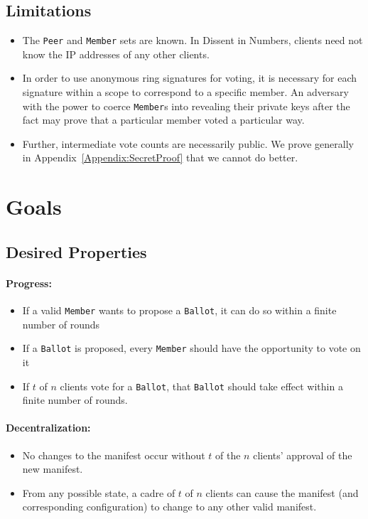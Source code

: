 \subsection{Limitations}
\begin{itemize}
  \item The \texttt{Peer} and \texttt{Member} sets are known. In Dissent in
    Numbers, clients need not know the IP addresses of any other clients.
  \item In order to use anonymous ring signatures for voting, it is necessary
    for each signature within a scope to correspond to a specific member. An
    adversary with the power to coerce \texttt{Member}s into revealing their
    private keys after the fact may prove that a particular member voted a
    particular way.
  \item Further, intermediate vote counts are necessarily public. We prove
    generally in Appendix~\ref{Appendix:SecretProof} that we cannot do better.
\end{itemize}

\section{Goals}
\subsection{Desired Properties}
\paragraph{Progress:}
\begin{itemize}
  \item If a valid \texttt{Member} wants to propose a \texttt{Ballot}, it can
    do so within a finite number of rounds
  \item If a \texttt{Ballot} is proposed, every \texttt{Member} should have
    the opportunity to vote on it
  \item If $t$ of $n$ clients vote for a \texttt{Ballot}, that \texttt{Ballot}
    should take effect within a finite number of rounds.
\end{itemize}
\paragraph{Decentralization:}
\begin{itemize}
  \item No changes to the manifest occur without $t$ of the $n$ clients'
    approval of the new manifest.
  \item From any possible state, a cadre of $t$ of $n$ clients can cause the
    manifest (and corresponding configuration) to change to any other valid
    manifest.
\end{itemize}

